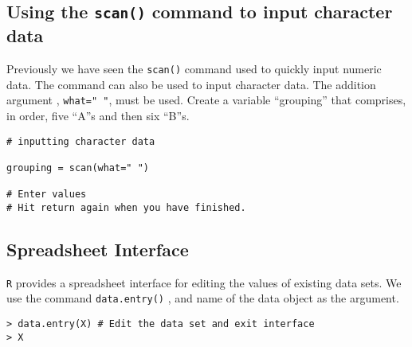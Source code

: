 \documentclass[a4paper,12pt]{article}
\begin{document}
\subsection{Using the \texttt{scan()} command to input character data}
Previously we have seen the \texttt{scan()} command used to quickly input numeric data. The command can also be used to input character data. The addition argument , \texttt{what=" "}, must be used.  
Create a variable “grouping” that comprises, in order,  five “A”s and then six “B”s.

\begin{verbatim}
# inputting character data

grouping = scan(what=" ")

# Enter values
# Hit return again when you have finished.

\end{verbatim}


\subsection{Spreadsheet Interface}
\texttt{R} provides a spreadsheet interface for editing the values of existing data sets.
We use the command \texttt{data.entry()} , and name of the data object as the argument.

\begin{verbatim}
> data.entry(X) # Edit the data set and exit interface
> X
\end{verbatim}










\end{document}
